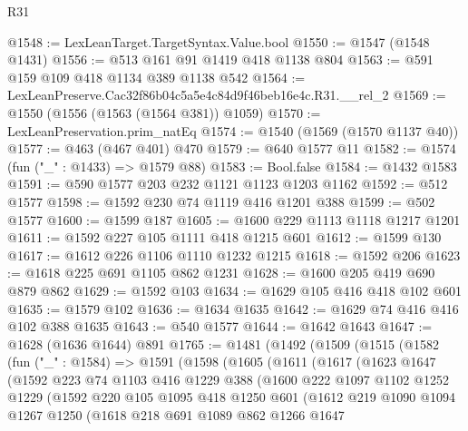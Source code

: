 \begin{lexlean}{R31}
\begin{coremodule}
@1548 := LexLeanTarget.TargetSyntax.Value.bool
@1550 := @1547 (@1548 @1431)
@1556 := @513 @161 @91 @1419 @418 @1138 @804
@1563 := @591 @159 @109 @418 @1134 @389 @1138 @542
@1564 := LexLeanPreserve.Cac32f86b04c5a5e4c84d9f46beb16e4c.R31.__rel_2
@1569 := @1550 (@1556 (@1563 (@1564 @381)) @1059)
@1570 := LexLeanPreservation.prim_natEq
@1574 := @1540 (@1569 (@1570 @1137 @40))
@1577 := @463 (@467 @401) @470
@1579 := @640 @1577 @11
@1582 := @1574 (fun ("_" : @1433) => @1579 @88)
@1583 := Bool.false
@1584 := @1432 @1583
@1591 := @590 @1577 @203 @232 @1121 @1123 @1203 @1162
@1592 := @512 @1577
@1598 := @1592 @230 @74 @1119 @416 @1201 @388
@1599 := @502 @1577
@1600 := @1599 @187
@1605 := @1600 @229 @1113 @1118 @1217 @1201
@1611 := @1592 @227 @105 @1111 @418 @1215 @601
@1612 := @1599 @130
@1617 := @1612 @226 @1106 @1110 @1232 @1215
@1618 := @1592 @206
@1623 := @1618 @225 @691 @1105 @862 @1231
@1628 := @1600 @205 @419 @690 @879 @862
@1629 := @1592 @103
@1634 := @1629 @105 @416 @418 @102 @601
@1635 := @1579 @102
@1636 := @1634 @1635
@1642 := @1629 @74 @416 @416 @102 @388 @1635
@1643 := @540 @1577
@1644 := @1642 @1643
@1647 := @1628 (@1636 @1644) @891
@1765 := @1481
    (@1492
      (@1509
        (@1515
          (@1582
            (fun ("_" : @1584) =>
            @1591
              (@1598
                (@1605
                  (@1611
                    (@1617
                      (@1623
                        @1647
                        (@1592
                          @223
                          @74
                          @1103
                          @416
                          @1229
                          @388
                          (@1600
                            @222
                            @1097
                            @1102
                            @1252
                            @1229
                            (@1592
                              @220
                              @105
                              @1095
                              @418
                              @1250
                              @601
                              (@1612
                                @219
                                @1090
                                @1094
                                @1267
                                @1250
                                (@1618
                                  @218
                                  @691
                                  @1089
                                  @862
                                  @1266
                                  @1647

\end{coremodule}
\end{lexlean}
